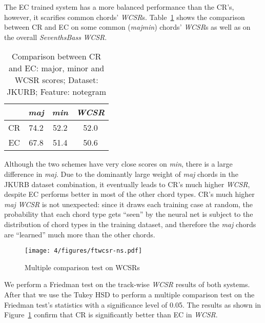The EC trained system has a more balanced performance than the CR's, however, it scarifies common chords' \textit{WCSR}s. Table~\ref{tab:4-wcsr-ns} shows the comparison between CR and EC on some common (\textit{majmin}) \cite{burgoyne2011expert} chords' \textit{WCSR}s as well as on the overall \textit{SeventhsBass} \textit{WCSR}.
\begin{table}[htb]
	\caption{Comparison between CR and EC: major, minor and WCSR scores; Dataset: JKURB; Feature: notegram}
	\centering
	\scriptsize
	\begin{tabular}{|c|c|c|c|} \hline
		& \textit{maj} & \textit{min} & \textit{WCSR} \\ \hline
		CR & 74.2 & 52.2 & 52.0 \\ \hline
		EC &  67.8 & 51.4 & 50.6 \\ \hline
	\end{tabular}
	\label{tab:4-wcsr-ns}
\end{table}

Although the two schemes have very close scores on \textit{min}, there is a large difference in \textit{maj}. Due to the dominantly large weight of \textit{maj} chords in the JKURB dataset combination, it eventually leads to CR's much higher \textit{WCSR}, despite EC performs better in most of the other chord types. CR's much higher \textit{maj} \textit{WCSR} is not unexpected: since it draws each training case at random, the probability that each chord type gets ``seen'' by the neural net is subject to the distribution of chord types in the training dataset, and therefore the \textit{maj} chords are ``learned'' much more than the other chords.

\begin{figure}[h!]
	\centering
	\texttt{[image: 4/figures/ftwcsr-ns.pdf]}
	\caption{Multiple comparison test on WCSRs}
	\label{fig:4-ftwcsr-ns}
\end{figure}
We perform a Friedman test on the track-wise \textit{WCSR} results of both systems. After that we use the Tukey HSD to perform a multiple comparison test on the Friedman test's statistics with a significance level of 0.05. The results as shown in Figure~\ref{fig:4-ftwcsr-ns} confirm that CR is significantly better than EC in \textit{WCSR}.

